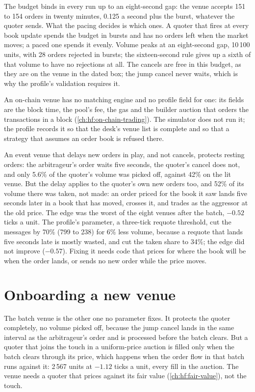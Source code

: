 The budget binds in every run up to an eight-second gap: the venue accepts 151 to 154 orders in twenty minutes, 0.125 a second plus the burst,
whatever the quoter sends. What the pacing decides is which ones. A quoter that fires at every book update spends the budget in bursts and has no
orders left when the market moves; a paced one spends it evenly. Volume peaks at an eight-second gap, 10\,100 units, with 28 orders rejected in
bursts; the sixteen-second rule gives up a sixth of that volume to have no rejections at all. The cancels are free in this budget, as they are on the
venue in the dated box; the jump cancel never waits, which is why the profile's validation requires it.

An on-chain venue has no matching engine and no profile field for one: its fields are the block time, the pool's fee, the gas and the builder
auction that orders the transactions in a block (\cref{ch:hf:on-chain-trading}). The simulator does not run it; the profile records it so that the
desk's venue list is complete and so that a strategy that assumes an order book is refused there.

An event venue that delays new orders in play, and not cancels, protects resting orders: the arbitrageur's order waits five seconds, the quoter's
cancel does not, and only 5.6\% of the quoter's volume was picked off, against 42\% on the lit venue. But the delay applies to the quoter's own new
orders too, and 52\% of its volume there was taken, not made: an order priced for the book it saw lands five seconds later in a book that has
moved, crosses it, and trades as the aggressor at the old price. The edge was the worst of the eight venues after the batch, $-0.52$ ticks a unit. The profile's
parameter, a three-tick requote threshold, cut the messages by 70\% (799 to 238) for 6\% less volume, because a requote that lands five seconds
late is mostly wasted, and cut the taken share to 34\%; the edge did not improve ($-0.57$). Fixing it needs code that prices for where the book will
be when the order lands, or sends no new order while the price moves.

\section{Onboarding a new venue}

The batch venue is the other one no parameter fixes. It protects the quoter completely, no volume picked off, because the jump cancel lands in the
same interval as the arbitrageur's order and is processed before the batch clears. But a quoter that joins the touch in a uniform-price auction is
filled only when the batch clears through its price, which happens when the order flow in that batch runs against it: 2\,567 units at $-1.12$ ticks a
unit, every fill in the auction. The venue needs a quoter that prices against its fair value (\cref{ch:hf:fair-value}),
not the touch.

